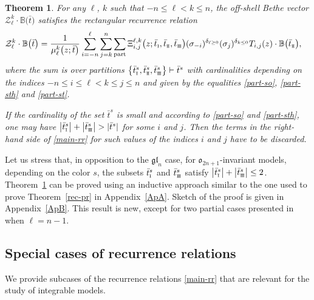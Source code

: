 \documentclass[10pt,a4paper]{amsart}
\newcommand{\so}{\scriptscriptstyle \rm I}
\newcommand{\st}{\scriptscriptstyle \rm I\hspace{-1pt}I}
\newcommand{\sth}{\scriptscriptstyle \rm I\hspace{-1pt}I\hspace{-1pt}I}
\newcommand{\bt}{{\bar t}}
\newtheorem{thm}{Theorem}[section]
\theoremstyle{definition}
\def\BB{{\mathbb{B}}}
\def\r#1{\eqref{#1}}
\def\Z{\mathcal{Z}}
\begin{document}
\begin{thm}\label{main-th}
For any $\ell$, $k$ such that $-n\leq \ell <k\leq n$, the off-shell Bethe vector
$\Z^k_\ell\cdot\BB\bigl(\bt\bigr)$ satisfies the rectangular recurrence relation
\begin{align}
\Z^k_\ell\cdot\BB\bigl(\bt\bigr)={}&\frac{1}{\mu^k_\ell\bigl(z;\bt\bigr)}\sum_{i=-n}^\ell
\sum_{j=k}^n\sum_{\rm part}
\Xi^{\ell,k}_{i,j}\bigl(z;\bt_{\so},\bt_{\st},\bt_{\sth}\bigr) (\sigma_{-i})^{\delta_{\ell\geq0}}
(\sigma_{j})^{\delta_{k\leq 0}} T_{i,j}(z)\cdot\BB\bigl(\bt_{\st}\bigr) ,\label{main-rr}
\end{align}
where the sum is over partitions
$\bigl\{\bt^s_{\so},\bt^s_{\st},\bt^s_{\sth}\bigr\}\vdash \bt^s$ with
cardinalities depending on the indices $-n\leq i\leq \ell<k\leq j\leq n$ and given by the equalities \r{part-so}, \r{part-sth} and \r{part-st}.

If the cardinality of the set $\bt^s$ is small and
according to \r{part-so} and \r{part-sth}, one may have $\big|\bt^s_{\so}\big|+\big|\bt^s_{\sth}\big|>|\bt^s|$
for some $i$ and $j$. Then the terms in
the right-hand side of \r{main-rr} for such values of the indices $i$ and $j$ have to be discarded.
\end{thm}

Let us stress that, in opposition to the $\mathfrak{gl}_n$ case, for
$\mathfrak{o}_{2n+1}$-invariant models, depending on the color $s$,
the subsets $\bt^s_{\so}$ and $\bt^s_{\sth}$ satisfy $\big|\bt^s_{\so}\big|+\big|\bt^s_{\sth}\big| \le 2$.
Theorem~\ref{main-th} can be proved using an inductive
approach similar to the one used to prove Theorem~\ref{rec-pr} in Appendix~\ref{ApA}. Sketch of the proof is given in Appendix~\ref{ApB}.
This result is new, except for two partial cases presented in~\cite{LP2} when $\ell=n-1$.

\subsection{Special cases of recurrence relations}\label{sect:ex-rec}
We provide subcases of the recurrence relations
\r{main-rr} that are relevant for the study of integrable models.
\end{document}
